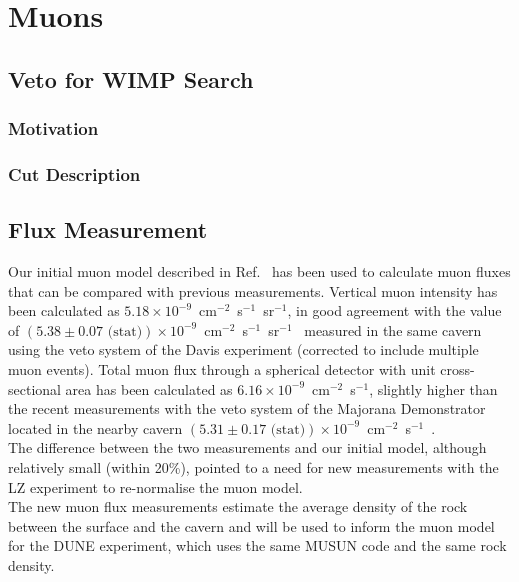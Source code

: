 \chapter{Muons}\label{chap:Muons}
\section{Veto for WIMP Search}
\subsection{Motivation}

\subsection{Cut Description}

\section{Flux Measurement}
Our initial muon model described in Ref.~\cite{LZ_SIMS} has been used to calculate muon fluxes that can be compared with previous measurements. Vertical muon intensity has been calculated as $5.18\times10^{-9}$~cm$^{-2}$~s$^{-1}$~sr$^{-1}$, in good agreement with the value of $(5.38\pm0.07\text{ (stat)})\times10^{-9}$~cm$^{-2}$~s$^{-1}$~sr$^{-1}$~\cite{Cherry} measured in the same cavern using the veto system of the Davis experiment (corrected to include multiple muon events). Total muon flux through a spherical detector with unit cross-sectional area has been calculated as $6.16\times10^{-9}$~cm$^{-2}$~s$^{-1}$, slightly higher than the recent measurements with the veto system of the Majorana Demonstrator located in the nearby cavern $(5.31\pm0.17 \text{ (stat)})\times10^{-9}$~cm$^{-2}$~s$^{-1}$~\cite{majorana}.\\
The difference between the two measurements and our initial model, although relatively small (within 20\%), pointed to a need for new measurements with the LZ experiment to re-normalise the muon model.\\
The new muon flux measurements estimate the average density of the rock between the surface and the cavern and will be used to inform the muon model for the DUNE experiment\cite{DUNE}, which uses the same MUSUN code and the same rock density.

